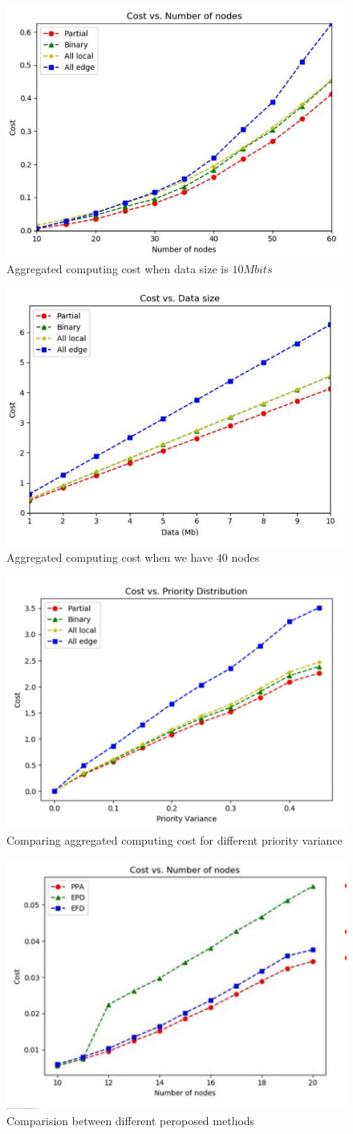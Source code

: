 \documentclass[12pt,final,3p]{CSP}
\begin{document}
\begin{figure}
    \centering
    \includegraphics[width=.45\textwidth]{images/1.png}
    \caption{Aggregated computing cost when data size is $10 Mbits$} \label{fig:1}
\end{figure}
\begin{figure}
    \centering
\includegraphics[width=.45\textwidth]{images/2.png}
\caption{Aggregated computing cost when we have $40$ nodes}\label{fig:2}
\end{figure}
\begin{figure}
    \centering
\includegraphics[width=.45\textwidth]{images/3.png}
\caption{Comparing aggregated computing cost for different priority variance}\label{fig:2}
\end{figure}

\begin{figure}
    \centering
\includegraphics[width=.45\textwidth]{images/4.png}
\caption{Comparision between different peroposed methods}\label{fig:2}
\end{figure}


 

\end{document}

